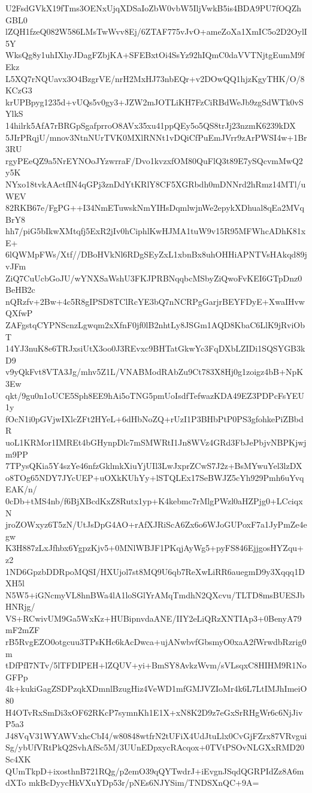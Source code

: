 U2FsdGVkX19fTms3OENxUjqXDSaIoZbW0vbW5IljVwkB5is4BDA9PU7fOQZhGBL0
lZQH1fzeQ082W586LMsTwWvv8Ej/6ZTAF775vJvO+ameZoXa1XmIC5o2D2OylI5Y
WksQg8y1uhIXhyJDagFZbjKA+SFEBxtOi4SsYz92hIQmC0daVVTNjtgEumM9fEkz
L5XQ7rNQUavx3O4BzgrVE/nrH2MxHJ73nbEQr+v2DOwQQ1hjzKgyTHK/O/8KCzG3
krUPBpyg1235d+vUQs5v0gy3+JZW2mJOTLiKH7FzCiRBdWeJb9zgSdWTk0vSYlkS
14hilrk5AfA7rBRGpSgafprroO8AVx35xu41ppQEy5o5QS8trJj23nzmK6239kDX
5JIrPRqjU/mnov3NtnNUrTVK0MXlRNNt1vDQiCfPuEmJVrr9zArPWSI4w+1Br3RU
rgyPEeQZ9a5NrEYNOoJYzwrraF/Dvo1kvzxfOM80QuFlQ3t89E7ySQcvmMwQ2y5K
NYxo18tvkAActfIN4qGPj3znDdYtKRlY8CF5XGRbdh0mDNNrd2hRmz14MTl/uWEV
82RKB67e/FgPG++I34NmETuwskNmYIHsDqmlwjnWe2epykXDhual8qEa2MVqBrY8
hh7/piG5bIkwXMtqfj5ExR2jIv0hCiphlKwHJMA1tuW9v15R95MFWhcADhK81xE+
6lQWMpFWs/Xtf//DBoHVkNl6RDgSEyZxL1xbnBx8uhOHHiAPNTVsHAkqd89jvJFm
ZiQ7CuUcbGoJU/wYNXSaWshU3FKJPRBNqqbcMSbyZiQwoFvKEI6GTpDnz0BeHB2c
nQRzfv+2Bw+4c5R8gIPSD8TClRcYE3bQ7nNCRPgGarjrBEYFDyE+XwaIHvwQXfwP
ZAFgstqCYPNScnzLgwqm2xXfnF0jf0lB2nhtLy8JSGm1AQD8KbaC6LlK9jRviObT
14YJ3nuK8e6TRJxsiUtX3oo0J3REvxc9BHTatGkwYc3FqDXbLZIDi1SQSYGB3kD9
v9yQkFvt8VTA3Jg/mhv5Z1L/VNABModRAbZu9Ct783X8Hj0g1zoigz4bB+NpK3Ew
qkt/9gu0n1oUCE5Sph8EE9hAi5oTNG5pmUoIsdfTefwazKDA49EZ3PDPcFsYEU1y
fOcN1i0pGVjwIXlcZFt2HYeL+6dHbNoZQ+rUzI1P3BHbPtP0PS3gfohkePiZBbdR
uoL1KRMor1IMREt4bGHynpDlc7mSMWRtI1Jn8WVz4GRd3FbJePbjvNBPKjwjm9PP
7TPysQKia5Y4szYe46nfzGklmkXiuYjUIl3LwJxprZCwS7J2z+BsMYwuYel3lzDX
o8TOg65NDY7JYcUEP+uOXkKUhYy+lSTQLEx17SeBWJZ5cYh929Pmh6uYvqEAK/n/
0cDb+tMS4nb/f6BjXBcdKxZ8Rutx1yp+K4kebmc7rMlgPWzl0aHZPjg0+LCciqxN
jroZOWxyz6T5zN/UtJsDpG4AO+rAfXJRiScA6Zx6o6WJoGUPoxF7a1JyPmZe4egw
K3H887zLxJfhbx6YgpzKjv5+0MNlWBJF1PKqjAyWg5+pyFS846EjjgosHYZqu+z2
1ND6GpzbDDRpoMQSI/HXUjol7st8MQ9U6qb7ReXwLiRR6auegmD9y3Xqqq1DXH5l
N5W5+iGNcmyVL8hnBWa4lA1loSGlYrAMqTmdhN2QXcvu/TLTD8msBUESJbHNRjg/
VS+RCwivUM9Ga5WxKz+HUBipnvdaANE/IIY2eLiQRzXNTIAp3+0BenyA79mF2mZF
rB5RvgEZO0otgcuu3TPsKHc6kAcDwca+ujANwbvfGbsmyO0xaA2fWrwdbRzrig0m
tDfPfI7NTv/5lTFDIPEH+lZQUV+yi+BmSY8AvkzWvm/sVLsqxC8HIHM9R1NoGFPp
4k+kukiGagZSDPzqkXDmnlBzugHiz4VeWD1mfGMJVZIoMr4k6L7LtIMJhImeiO80
H4OTvRxSmDi3xOF62RKcP7symnKh1E1X+xN8K2D9z7eGxSrRHgWr6c6NjJivP5a3
J48VqV31WYAWVxhcCbI4/w80848wtfrN2tUFiX4UdJtuLlx0CvGjFZrx87VRvgui
Sg/ybUfVRtPkQ2SvhAfSc5M/3UUnEDpxycRAcqox+0TVtPSOvNLGXxRMD20Sc4XK
QUmTkpD+ixosthnB721RQg/p2emO39qQYTwdrJ+iEvgnJSqdQGRPIdZz8A6mdXTo
mkBcDyycHkVXuYDp53r/pNEs6NJYSim/TNDSXnQC+9A=
